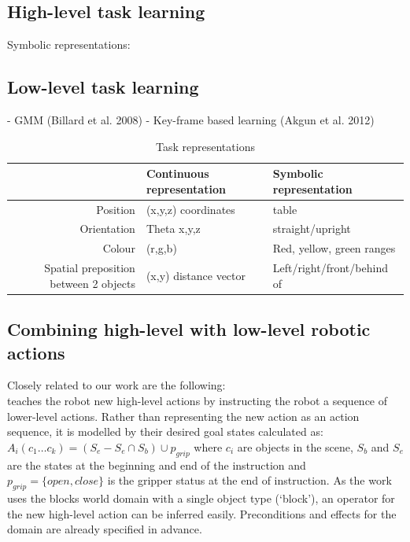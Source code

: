 \subsection{High-level task learning}
Symbolic representations:
\
\subsection{Low-level task learning}
- GMM (Billard et al. 2008)
- Key-frame based learning (Akgun et al. 2012)

\begin{table}[ht]
\centering
\caption{Task representations}
\label{tab:representations}
\begin{tabular}{r|ll}
 & Continuous representation & Symbolic representation\\ \hline
Position & (x,y,z) coordinates & table \\
Orientation  & Theta x,y,z  & straight/upright \\
Colour & (r,g,b) & Red, yellow, green ranges\\
Spatial preposition between 2 objects & (x,y) distance vector & Left/right/front/behind of 
\end{tabular}
\end{table}

\subsection{Combining high-level with low-level robotic actions}
Closely related to our work are the following:\\
\cite{she2014teaching} teaches the robot new high-level actions by instructing the robot a sequence of lower-level actions.
Rather than representing the new action as an action sequence, it is modelled by their desired goal states calculated as:
$A_i(c_1 \dots c_k) = (S_e - S_e \cap S_b) \cup p_{grip}$ where $c_i$ are objects in the scene, $S_b$ and $S_e$ are the states at the beginning and end of the instruction and $p_{grip} = \{open, close\}$ is the gripper status at the end of instruction.
As the work uses the blocks world domain with a single object type (`block'), an operator for the new high-level action can be inferred easily. Preconditions and effects for the domain are already specified in advance.

